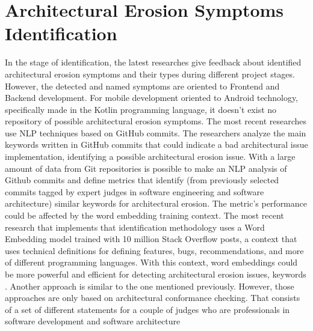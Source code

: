 \section{Architectural Erosion Symptoms Identification}
In the stage of identification, the latest researches give feedback about identified architectural erosion symptoms and their types during different project stages. However, the detected and named symptoms are oriented to Frontend and Backend development. For mobile development oriented to Android technology, specifically made in the Kotlin programming language, it doesn't exist no repository of possible architectural erosion symptoms. The most recent researches use NLP techniques based on GitHub commits. The researchers analyze the main keywords written in GitHub commits that could indicate a bad architectural issue implementation, identifying a possible architectural erosion issue.
With a large amount of data from Git repositories is possible to make an NLP analysis of Github commits and define metrics that identify (from previously selected commits tagged by expert judges in software engineering and software architecture) similar keywords for architectural erosion. The metric's performance could be affected by the word embedding training context. The most recent research that implements that identification methodology uses a Word Embedding model trained with 10 million Stack Overflow posts, a context that uses technical definitions for defining features, bugs, recommendations, and more of different programming languages. With this context, word embeddings could be more powerful and efficient for detecting architectural erosion issues, keywords \cite{warnings-architectural-erosion,so-word-embedding}.
Another approach is similar to the one mentioned previously. However, those approaches are only based on architectural conformance checking. That consists of a set of different statements for a couple of judges who are professionals in software development and software architecture


